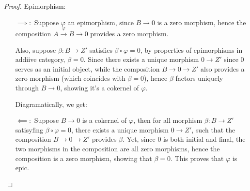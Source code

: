 \documentclass[x11names,reqno,12pt]{extarticle}
\begin{document}
\begin{proof}
    Epimorphism:
    \begin{itemize}
        \item[$\implies:$] Suppose $\varphi$ an epimorphism, since $B\rightarrow 0$ is a zero morphism, hence the composition $A\xrightarrow{\varphi}B \rightarrow 0$ provides a zero morphism.

        Also, suppose $\beta:B\rightarrow Z'$ satisfies $\beta\circ \varphi = 0$, by properties of epimorphisms in addiive category, $\beta = 0$. Since there exists a unique morphism $0\rightarrow Z'$ since $0$ serves as an initial object, while the composition $B\rightarrow 0\rightarrow Z'$ also provides a zero morphism (which coincides with $\beta=0$), hence $\beta$ factors uniquely through $B\rightarrow 0$, showing it's a cokernel of $\varphi$.

        Diagramatically, we get:
        \begin{center}
        \end{center}

        \item[$\impliedby:$] Suppose $B\rightarrow 0$ is a cokernel of $\varphi$, then for all morphism $\beta:B\rightarrow Z'$ satisyfing $\beta\circ \varphi = 0$, there exists a unique morphism $0\rightarrow Z'$, such that the composition $B\rightarrow 0\rightarrow Z'$ provides $\beta$. Yet, since $0$ is both initial and final, the two morphisms in the composition are all zero morphisms, hence the composition is a zero morphism, showing that $\beta=0$. This proves that $\varphi$ is epic.
    \end{itemize}
\end{proof}

\hfil
\end{document}
